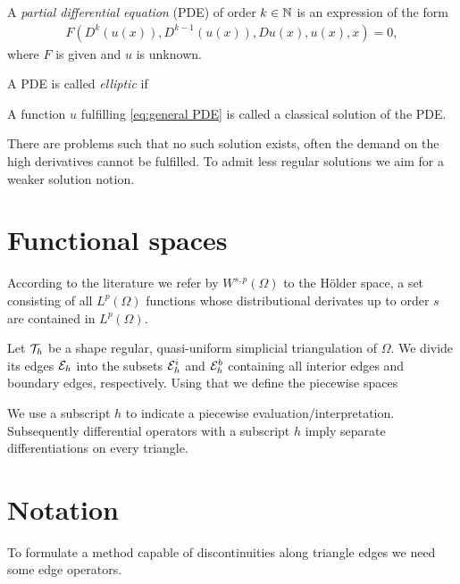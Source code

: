 
\begin{definition}
 A \emph{partial differential equation} (PDE) of order $k\in \mathbb{N}$ is an expression of the form
\begin{align}
	F(D^k(u(x)), D^{k-1}(u(x)), Du(x), u(x), x) = 0, \label{eq:general PDE}
\end{align}
where $F$ is given and $u$ is unknown.
\end{definition}


\begin{definition}
	A PDE is called \emph{elliptic} if 
	
\end{definition}

A function $u$ fulfilling \eqref{eq:general PDE} is called a classical solution of the PDE.

There are problems such that no such solution exists, often the demand on the high derivatives cannot be fulfilled. To admit less regular solutions we aim for a weaker solution notion.


\section{Functional spaces}

According to the literature we refer by $W^{s,p}(\Omega)$ to the H\"older space, a set consisting of all $L^p(\Omega)$ functions whose distributional derivates up to order $s$ are contained in $L^ p(\Omega)$.

Let $\mathcal{T}_h$ be a shape regular, quasi-uniform simplicial triangulation of $\Omega$. We divide its edges $\mathcal{E}_h$ into the subsets $\mathcal{E}_h^i$ and $\mathcal{E}_h^b$ containing all interior edges and boundary edges, respectively.
Using that we define the piecewise spaces

We use a subscript $h$ to indicate a piecewise evaluation/interpretation. Subsequently differential operators with a subscript $h$ imply separate differentiations on every triangle.


\section{Notation}

To formulate a method capable of discontinuities along triangle edges we need some edge operators.   

